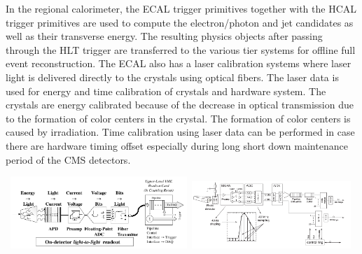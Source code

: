 In the regional calorimeter, the ECAL trigger primitives together with the HCAL trigger primitives are used to  compute the electron/photon and jet candidates as well as their transverse energy. The resulting physics objects after passing through the HLT trigger are transferred to the various tier systems for offline full event reconstruction. The ECAL also has a laser calibration systems where laser light is delivered directly to the \pb crystals using optical fibers. The laser data is used for energy and time calibration of crystals and hardware system. The crystals are energy calibrated because of the decrease in optical transmission due to the formation of color centers in the crystal. The formation of color centers is caused by irradiation. Time calibration using laser data can be performed in case there are hardware timing offset especially during long short down maintenance period of the CMS detectors.
\begin{center}
\centering
\mbox{
\includegraphics[height=0.5\textwidth, width=0.50\textwidth]{THESISPLOTS/CMS-ECAL-READOUT-CHAIN.png} \quad
\includegraphics[height=0.5\textwidth, width=0.450\textwidth]{THESISPLOTS/ReadOut.png}
} 
\label{fig:readout}
\end{center}


